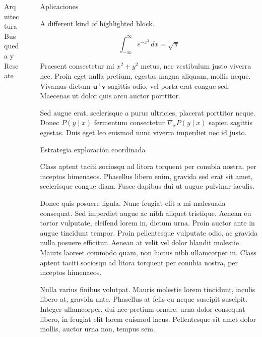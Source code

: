 \documentclass[final]{beamer}
\newlength{\sepwidth}
\newlength{\colwidth}
\newcommand{\separatorcolumn}{\begin{column}{\sepwidth}\end{column}}
\begin{document}
\begin{frame}[t]
\begin{columns}[t]
\begin{column}{\colwidth}
\begin{block}{Arquitectura Busqueda y Rescate}
  \end{block}

\end{column}

\separatorcolumn

\begin{column}{\colwidth}
  
  \begin{exampleblock}{Aplicaciones}
    
    A different kind of highlighted block.

    $$
    \int_{-\infty}^{\infty} e^{-x^2}\,dx = \sqrt{\pi}
    $$
    

    Praesent consectetur mi $x^2 + y^2$ metus, nec vestibulum justo viverra
    nec. Proin eget nulla pretium, egestas magna aliquam, mollis neque. Vivamus
    dictum $\mathbf{u}^\intercal\mathbf{v}$ sagittis odio, vel porta erat
    congue sed. Maecenas ut dolor quis arcu auctor porttitor.


    Sed augue erat, scelerisque a purus ultricies, placerat porttitor neque.
    Donec $P(y \mid x)$ fermentum consectetur $\nabla_x P(y \mid x)$ sapien
    sagittis egestas. Duis eget leo euismod nunc viverra imperdiet nec id
    justo.

  \end{exampleblock}

  \begin{block}{Estrategia exploración coordinada}
    
    Class aptent taciti sociosqu ad litora torquent per conubia nostra, per
    inceptos himenaeos. Phasellus libero enim, gravida sed erat sit amet,
    scelerisque congue diam. Fusce dapibus dui ut augue pulvinar iaculis.

    Donec quis posuere ligula. Nunc feugiat elit a mi malesuada consequat. Sed
    imperdiet augue ac nibh aliquet tristique. Aenean eu tortor vulputate,
    eleifend lorem in, dictum urna. Proin auctor ante in augue tincidunt
    tempor. Proin pellentesque vulputate odio, ac gravida nulla posuere
    efficitur. Aenean at velit vel dolor blandit molestie. Mauris laoreet
    commodo quam, non luctus nibh ullamcorper in. Class aptent taciti sociosqu
    ad litora torquent per conubia nostra, per inceptos himenaeos.

    Nulla varius finibus volutpat. Mauris molestie lorem tincidunt, iaculis
    libero at, gravida ante. Phasellus at felis eu neque suscipit suscipit.
    Integer ullamcorper, dui nec pretium ornare, urna dolor consequat libero,
    in feugiat elit lorem euismod lacus. Pellentesque sit amet dolor mollis,
    auctor urna non, tempus sem.


\end{block}
\end{column}
\end{columns}
\end{frame}
\end{document}
